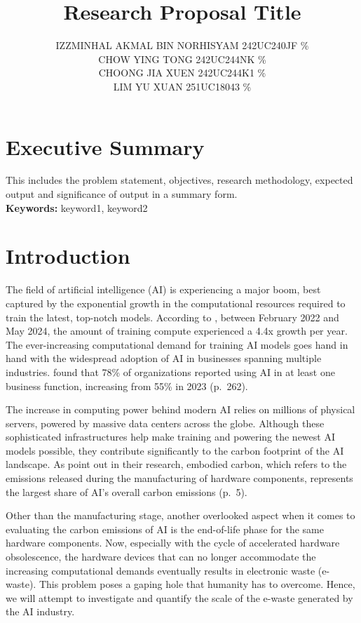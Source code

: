 \documentclass[a4paper, 12pt]{article}
\author{
IZZMINHAL AKMAL BIN NORHISYAM \quad 242UC240JF \quad 25\% \\
CHOW YING TONG \quad 242UC244NK \quad 25\% \\
CHOONG JIA XUEN \quad 242UC244K1 \quad 25\% \\
LIM YU XUAN \quad 251UC18043 \quad 25\% \\
}
\title{ Research Proposal Title  }
\begin{document}
\maketitle

\section*{Executive Summary}
This includes the problem statement, objectives, research methodology, expected output and significance of output in a summary form. 
\hfill
\\
\textbf{Keywords:} keyword1, keyword2 \\

\section{Introduction}
The field of artificial intelligence (AI) is experiencing a major boom, best captured by the exponential growth in the computational resources required to train the latest, top-notch models. According to \citet{Sevilla_Roldan_2024}, between February 2022 and May 2024, the amount of training compute experienced a 4.4x growth per year. The ever-increasing computational demand for training AI models goes hand in hand with the widespread adoption of AI in businesses spanning multiple industries. \citet{Maslej2025} found that 78\% of organizations reported using AI in at least one business function, increasing from 55\% in 2023 (p.~262). 

\par The increase in computing power behind modern AI relies on millions of physical servers, powered by massive data centers across the globe. Although these sophisticated infrastructures help make training and powering the newest AI models possible, they contribute significantly to the carbon footprint of the AI landscape. As \citet{Wu2022} point out in their research, embodied carbon, which refers to the emissions released during the manufacturing of hardware components, represents the largest share of AI’s overall carbon emissions (p.~5). 

\par Other than the manufacturing stage, another overlooked aspect when it comes to evaluating the carbon emissions of AI is the end-of-life phase for the same hardware components. Now, especially with the cycle of accelerated hardware obsolescence, the hardware devices that can no longer accommodate the increasing computational demands eventually results in electronic waste (e-waste). This problem poses a gaping hole that humanity has to overcome. Hence, we will attempt to investigate and quantify the scale of the e-waste generated by the AI industry.
\end{document}
